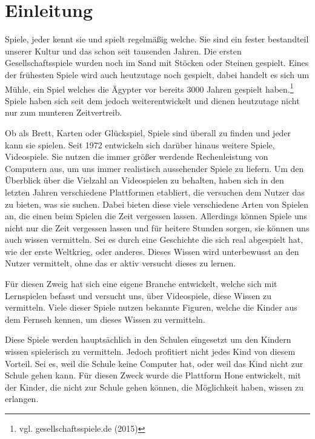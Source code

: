 \chapter{Einleitung}


Spiele, jeder kennt sie und spielt regelmäßig welche. Sie sind ein fester bestandteil unserer Kultur und das schon seit tausenden Jahren. Die ersten Gesellschaftsspiele wurden noch im Sand mit Stöcken oder Steinen gespielt.  Eines der frühesten Spiele wird auch heutzutage noch gespielt, dabei handelt es sich um Mühle, ein Spiel welches die Ägypter vor bereits 3000 Jahren gespielt haben.\footnote{vgl. gesellschaftsspiele.de \cite{spiele} (2015)} Spiele haben sich seit dem jedoch weiterentwickelt und dienen heutzutage nicht nur zum munteren Zeitvertreib. 

Ob als Brett, Karten oder Glückspiel, Spiele sind überall zu finden und jeder kann sie spielen. Seit 1972 entwickeln sich darüber hinaus weitere Spiele, Videospiele. Sie nutzen die immer größer werdende Rechenleistung von Computern aus, um uns immer realistisch aussehender Spiele zu liefern. 
Um den Überblick über die Vielzahl an Videospielen zu behalten, haben sich in den letzten Jahren verschiedene Plattformen etabliert, die versuchen dem Nutzer das zu bieten, was sie suchen. Dabei bieten diese viele verschiedene Arten von Spielen an, die einen beim Spielen die Zeit vergessen lassen.
Allerdings können Spiele uns nicht nur die Zeit vergessen lassen und für heitere Stunden sorgen, sie können uns auch wissen vermitteln. Sei es durch eine Geschichte die sich real abgespielt hat, wie der erste Weltkrieg, oder anderes. Dieses Wissen wird unterbewusst an den Nutzer vermittelt, ohne das er aktiv versucht dieses zu lernen.

Für diesen Zweig hat sich eine eigene Branche entwickelt, welche sich mit Lernspielen befasst und versucht uns, über Videospiele, diese Wissen zu vermitteln. Viele dieser Spiele nutzen bekannte Figuren, welche die Kinder aus dem Fernseh kennen, um dieses Wissen zu vermitteln.

Diese Spiele werden hauptsächlich in den Schulen eingesetzt um den Kindern wissen spielerisch zu vermitteln. Jedoch profitiert nicht jedes Kind von diesem Vorteil. Sei es, weil die Schule keine Computer hat, oder weil das Kind nicht zur Schule gehen kann. Für diesen Zweck wurde die Plattform Hone entwickelt, mit der Kinder, die nicht zur Schule gehen können, die Möglichkeit haben, wissen zu erlangen. 

